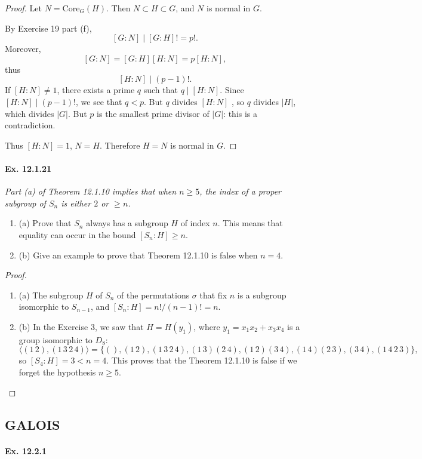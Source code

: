 \documentclass[11pt,a4paper]{article}
\newcommand{\be} {\begin{enumerate}}
\newcommand{\ee} {\end{enumerate}}
\begin{document}
\begin{proof}
Let $N = \mathrm{Core}_G(H)$. Then $N \subset H \subset G$, and $N$ is normal in $G$.

By Exercise 19 part (f),
$$[G:N] \mid [G:H]! = p!.$$
Moreover, 
$$[G:N] = [G:H] [H:N] = p [H:N],$$
thus $$[H:N] \mid (p-1)!.$$
If $[H:N] \ne 1$, there exists a prime $q$ such that $q\mid [H:N]$. Since $[H:N] \mid (p-1)!$, we see that $q<p$. But $q$ divides $[H:N]$ , so $q$ divides $|H|$, which divides $|G|$. But $p$ is the smallest prime divisor of $|G|$: this is a contradiction.

Thus $[H:N] = 1$, $N = H$. Therefore $H = N$ is normal in $G$.
\end{proof}

\paragraph{Ex. 12.1.21}

{\it Part (a) of Theorem 12.1.10 implies that when $n\geq 5$, the index of a proper subgroup of $S_n$ is either $2$ or $\geq n$.
\be
\item[(a)] Prove that $S_n$ always has a subgroup $H$ of index $n$. This means that equality can occur in the bound $[S_n:H] \geq n$.

\item[(b)] Give an example to prove that Theorem 12.1.10 is false when $n=4$.
\ee
}

\begin{proof}
\be
\item[(a)] The subgroup $H$ of $S_n$ of the permutations $\sigma$ that fix $n$ is a subgroup isomorphic to $S_{n-1}$, and $[S_n : H ] = n!/(n-1)! = n$.
\item[(b)] In the Exercise 3, we saw that $H = H(y_1)$, where $y_1 = x_1x_2+x_3x_4$ is a group isomorphic to $D_8$:
$$\langle (1\, 2), (1\,3\,2\,4) \rangle= \{(), (1\,2), (1\,3\,2\,4), (1\,3)(2\,4), (1\,2)(3\,4), (1\,4)(2\,3), (3\,4), (1\,4\,2\,3)\},$$
so $[S_4 : H] = 3 <n=4$. This proves that the Theorem 12.1.10 is false if we forget the hypothesis $n\geq 5$.
\ee
\end{proof}

\subsection{GALOIS}

\paragraph{Ex. 12.2.1}
\end{document}
